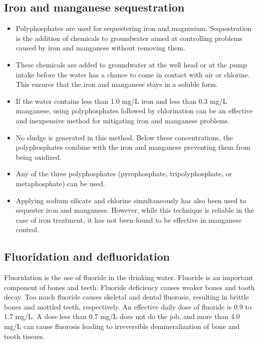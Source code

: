 \subsection{Iron and manganese sequestration}
\begin{itemize}
\item Polyphosphates are used for sequestering iron and magnesium. Sequestration is the addition of chemicals to groundwater aimed at controlling problems caused by iron and manganese without removing them.
\item These chemicals are added to groundwater at the well head or at the pump intake before the water has a chance to come in contact with air or chlorine. This ensures that the iron and manganese stays in a soluble form.
\item If the water contains less than 1.0 mg/L iron and less than 0.3 mg/L manganese, using polyphosphates followed by chlorination can be an effective and inexpensive method for mitigating iron and manganese problems. 
\item No sludge is generated in this method. Below these concentrations, the polyphosphates combine with the iron and manganese preventing them from being oxidized. 
\item Any of the three polyphosphates (pyrophosphate, tripolyphosphate, or metaphosphate) can be used.
\item Applying sodium silicate and chlorine simultaneously has also been used to sequester iron and manganese. However, while this technique is reliable in the case of iron treatment, it has not been found to be effective in manganese control.  
\end{itemize}

\subsection{Fluoridation and defluoridation}
Fluoridation is the use of fluoride in the drinking water. Fluoride is an important component of bones and teeth. Fluoride deficiency causes weaker bones and tooth decay. Too much fluoride causes skeletal and dental fluorosis, resulting in brittle bones and mottled teeth, respectively.  An effective daily dose of fluoride is 0.9 to 1.7 mg/L. A dose less than 0.7 mg/L does not do the job, and more than 4.0 mg/L can cause fluorosis leading to irreversible demineralization of bone and tooth tissues.\\

